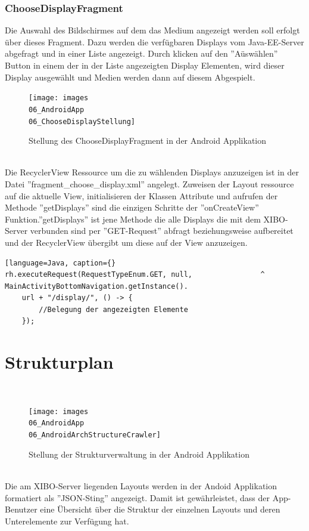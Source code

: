 \subsubsection{ChooseDisplayFragment}
Die Auswahl des Bildschirmes auf dem das Medium angezeigt werden soll erfolgt über dieses Fragment. Dazu werden die verfügbaren Displays vom Java-EE-Server abgefragt und in einer Liste angezeigt. Durch klicken auf den ''Aüswählen'' Button in einem der in der Liste angezeigten Display Elementen, wird dieser Display ausgewählt und Medien werden dann auf diesem Abgespielt. 
\\
\begin{figure}[H]
\centering
\texttt{[image: images\\06\_AndroidApp\\06\_ChooseDisplayStellung]}
\caption{Stellung des ChooseDisplayFragment in der Android Applikation}
\label{fig:mediaNav}
\end{figure}
\\
Die RecyclerView Ressource um die zu wählenden Displays anzuzeigen ist in der Datei ''fragment\_choose\_display.xml'' angelegt. Zuweisen der Layout ressource auf die aktuelle View, initialisieren der Klassen Attribute und aufrufen der Methode ''getDisplays'' sind die einzigen Schritte der ''onCreateView'' Funktion.''getDisplays'' ist jene Methode die alle Displays die mit dem XIBO-Server verbunden sind per ''GET-Request'' abfragt beziehungsweise aufbereitet und der RecyclerView übergibt um diese auf der View anzuzeigen. 
\begin{lstlisting}[language=Java, caption={}
rh.executeRequest(RequestTypeEnum.GET, null, 				^						MainActivityBottomNavigation.getInstance().
	url + "/display/", () -> {
		//Belegung der angezeigten Elemente
	});
\end{lstlisting}
\section{Strukturplan}
\\
\begin{figure}[H]
\centering
\texttt{[image: images\\06\_AndroidApp\\06\_AndroidArchStructureCrawler]}
\caption{Stellung der Strukturverwaltung in der Android Applikation}
\label{fig:mediaNav}
\end{figure}
\\	
Die am XIBO-Server liegenden Layouts werden in der Andoid Applikation formatiert als ''JSON-Sting'' angezeigt. Damit ist gewährleistet, dass der App-Benutzer eine Übersicht über die Struktur der einzelnen Layouts und deren Unterelemente zur Verfügung hat.
